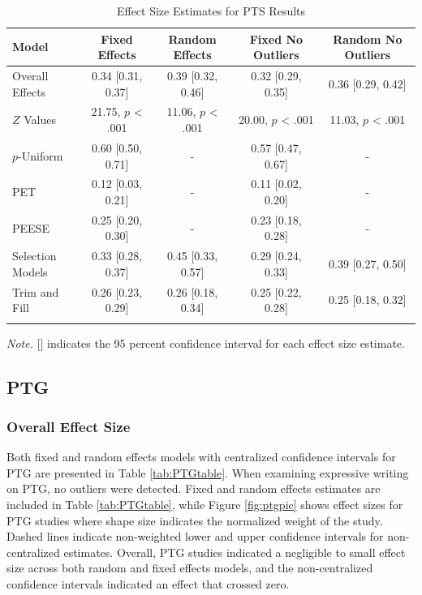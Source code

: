 \documentclass[english,man, mask]{apa6}
\theoremstyle{definition}
\theoremstyle{definition}
\theoremstyle{definition}
\theoremstyle{remark}
\begin{document}
\begin{table}[tbp]
\begin{center}
\begin{threeparttable}
\caption{\label{tab:PTStable}Effect Size Estimates for PTS Results}
\small{
\begin{tabular}{lcccc}
\toprule
Model & Fixed Effects & Random Effects & Fixed No Outliers & Random No Outliers\\
\midrule
Overall Effects & 0.34 [0.31, 0.37] & 0.39 [0.32, 0.46] & 0.32 [0.29, 0.35] & 0.36 [0.29, 0.42]\\
$Z$ Values & 21.75, $p$ < .001 & 11.06, $p$ < .001 & 20.00, $p$ < .001 & 11.03, $p$ < .001\\
$p$-Uniform & 0.60 [0.50, 0.71] & - & 0.57 [0.47, 0.67] & -\\
PET & 0.12 [0.03, 0.21] & - & 0.11 [0.02, 0.20] & -\\
PEESE & 0.25 [0.20, 0.30] & - & 0.23 [0.18, 0.28] & -\\
Selection Models & 0.33 [0.28, 0.37] & 0.45 [0.33, 0.57] & 0.29 [0.24, 0.33] & 0.39 [0.27, 0.50]\\
Trim and Fill & 0.26 [0.23, 0.29] & 0.26 [0.18, 0.34] & 0.25 [0.22, 0.28] & 0.25 [0.18, 0.32]\\
\bottomrule
\addlinespace
\end{tabular}
}
\begin{tablenotes}[para]
\textit{Note.} [] indicates the 95 percent confidence interval for each effect size estimate.
\end{tablenotes}
\end{threeparttable}
\end{center}
\end{table}

\subsection{PTG}\label{ptg}

\subsubsection{Overall Effect Size}\label{overall-effect-size-1}

Both fixed and random effects models with centralized confidence
intervals for PTG are presented in Table \ref{tab:PTGtable}. When
examining expressive writing on PTG, no outliers were detected. Fixed
and random effects estimates are included in Table \ref{tab:PTGtable},
while Figure \ref{fig:ptgpic} shows effect sizes for PTG studies where
shape size indicates the normalized weight of the study. Dashed lines
indicate non-weighted lower and upper confidence intervals for
non-centralized estimates. Overall, PTG studies indicated a negligible
to small effect size across both random and fixed effects models, and
the non-centralized confidence intervals indicated an effect that
crossed zero.
\end{document}
